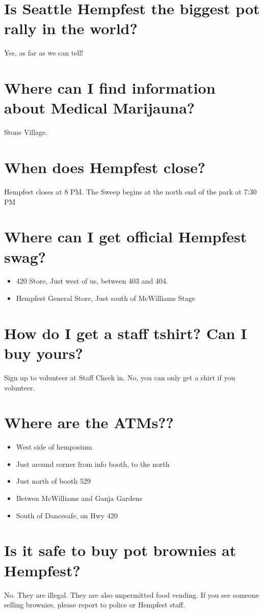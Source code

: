 \section{Is Seattle Hempfest the biggest pot rally in the world?}
Yes, as far as we can tell!

\section{Where can I find information about Medical Marijauna?}
Stone Village.

\section{When does Hempfest close?}
Hempfest closes at 8 PM. The Sweep begins at the north end of the park at 7:30 PM

\section{Where can I get official Hempfest swag?}
\begin{itemize}
	\item 420 Store, Just west of us, between 403 and 404.
	\item Hempfest General Store, Just south of McWilliams Stage
\end{itemize}

\section{How do I get a staff tshirt? Can I buy yours?}
Sign up to volunteer at Staff Check in. No, you can only get a shirt if  you volunteer.

\section{Where are the ATMs??}
\begin{itemize}
	\item West side of hemposium
	\item Just around corner from info booth, to the north
	\item Just north of booth 529
	\item Betwen McWilliams and Ganja Gardens
	\item South of Dancesafe, on Hwy 420
\end{itemize}

\section{Is it safe to buy pot brownies at Hempfest?}
No. They are illegal. They are also unpermitted food vending. If you see someone selling brownies, please report to police or Hempfest staff. 

